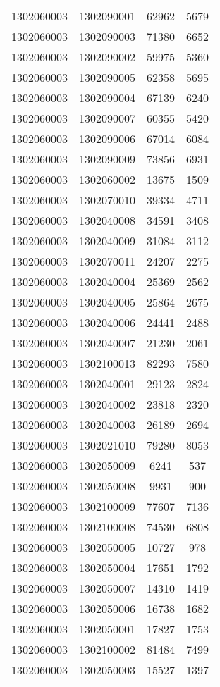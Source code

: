 \begin{longtable}{llcc}
1302060003 & 1302090001 & 62962 & 5679\\
1302060003 & 1302090003 & 71380 & 6652\\
1302060003 & 1302090002 & 59975 & 5360\\
1302060003 & 1302090005 & 62358 & 5695\\
1302060003 & 1302090004 & 67139 & 6240\\
1302060003 & 1302090007 & 60355 & 5420\\
1302060003 & 1302090006 & 67014 & 6084\\
1302060003 & 1302090009 & 73856 & 6931\\
1302060003 & 1302060002 & 13675 & 1509\\
1302060003 & 1302070010 & 39334 & 4711\\
1302060003 & 1302040008 & 34591 & 3408\\
1302060003 & 1302040009 & 31084 & 3112\\
1302060003 & 1302070011 & 24207 & 2275\\
1302060003 & 1302040004 & 25369 & 2562\\
1302060003 & 1302040005 & 25864 & 2675\\
1302060003 & 1302040006 & 24441 & 2488\\
1302060003 & 1302040007 & 21230 & 2061\\
1302060003 & 1302100013 & 82293 & 7580\\
1302060003 & 1302040001 & 29123 & 2824\\
1302060003 & 1302040002 & 23818 & 2320\\
1302060003 & 1302040003 & 26189 & 2694\\
1302060003 & 1302021010 & 79280 & 8053\\
1302060003 & 1302050009 & 6241 & 537\\
1302060003 & 1302050008 & 9931 & 900\\
1302060003 & 1302100009 & 77607 & 7136\\
1302060003 & 1302100008 & 74530 & 6808\\
1302060003 & 1302050005 & 10727 & 978\\
1302060003 & 1302050004 & 17651 & 1792\\
1302060003 & 1302050007 & 14310 & 1419\\
1302060003 & 1302050006 & 16738 & 1682\\
1302060003 & 1302050001 & 17827 & 1753\\
1302060003 & 1302100002 & 81484 & 7499\\
1302060003 & 1302050003 & 15527 & 1397\\

\end{longtable}
